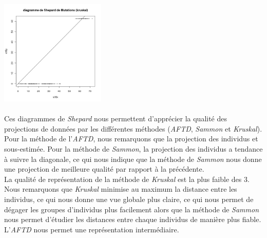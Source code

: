 \documentclass[a4paper, 10pt]{article}
\begin{document}
\includegraphics[height = 5cm, width = 5cm]{plots/plot_mutations_shepard_kruskal.png}\\ \\
Ces diagrammes de \textit{Shepard} nous permettent d'apprécier la qualité des projections de données par les différentes méthodes
(\textit{AFTD}, \textit{Sammon} et \textit{Kruskal}).
Pour la méthode de l'\textit{AFTD}, nous remarquons que la projection des individus et sous-estimée.
Pour la méthode de \textit{Sammon}, la projection des individus a tendance à suivre la diagonale, ce qui nous indique que la méthode de
\textit{Sammon} nous donne une projection de meilleure qualité par rapport à la précédente.\\
La qualité de représentation de la méthode de \textit{Kruskal} est la plus faible des 3.
Nous remarquons que \textit{Kruskal} minimise au maximum la distance entre les individus, ce qui nous donne une vue globale plus claire,
ce qui nous permet de dégager les groupes d'individus plus facilement alors que la méthode de \textit{Sammon} nous permet d'étudier
les distances entre chaque individus de manière plus fiable.
L'\textit{AFTD} nous permet une représentation intermédiaire.\\ \\
\end{document}
